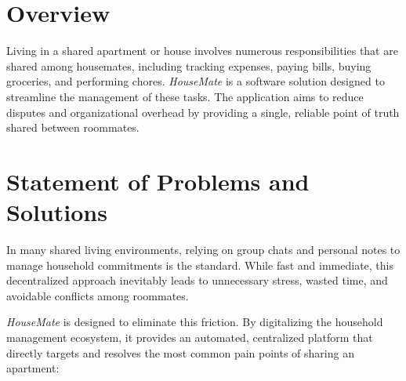 \section{Overview}
Living in a shared apartment or house involves numerous responsibilities that are shared among housemates, including tracking expenses, paying bills, buying groceries, and performing chores. \textit{HouseMate} is a software solution designed to streamline the management of these tasks. The application aims to reduce disputes and organizational overhead by providing a single, reliable point of truth shared between roommates.

\section{Statement of Problems and Solutions}

In many shared living environments, relying on group chats and personal notes to manage household commitments is the standard. While fast and immediate, this decentralized approach inevitably leads to unnecessary stress, wasted time, and avoidable conflicts among roommates. 

\textit{HouseMate} is designed to eliminate this friction. By digitalizing the household management ecosystem, it provides an automated, centralized platform that directly targets and resolves the most common pain points of sharing an apartment:

